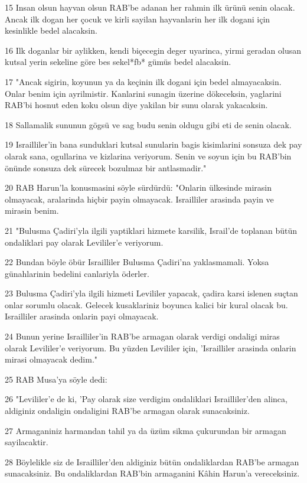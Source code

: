\par 15 Insan olsun hayvan olsun RAB'be adanan her rahmin ilk ürünü senin olacak. Ancak ilk dogan her çocuk ve kirli sayilan hayvanlarin her ilk dogani için kesinlikle bedel alacaksin.
\par 16 Ilk doganlar bir aylikken, kendi biçecegin deger uyarinca, yirmi geradan olusan kutsal yerin sekeline göre bes sekel*fb* gümüs bedel alacaksin.
\par 17 "Ancak sigirin, koyunun ya da keçinin ilk dogani için bedel almayacaksin. Onlar benim için ayrilmistir. Kanlarini sunagin üzerine dökeceksin, yaglarini RAB'bi hosnut eden koku olsun diye yakilan bir sunu olarak yakacaksin.
\par 18 Sallamalik sununun gögsü ve sag budu senin oldugu gibi eti de senin olacak.
\par 19 Israilliler'in bana sunduklari kutsal sunularin bagis kisimlarini sonsuza dek pay olarak sana, ogullarina ve kizlarina veriyorum. Senin ve soyun için bu RAB'bin önünde sonsuza dek sürecek bozulmaz bir antlasmadir."
\par 20 RAB Harun'la konusmasini söyle sürdürdü: "Onlarin ülkesinde mirasin olmayacak, aralarinda hiçbir payin olmayacak. Israilliler arasinda payin ve mirasin benim.
\par 21 "Bulusma Çadiri'yla ilgili yaptiklari hizmete karsilik, Israil'de toplanan bütün ondaliklari pay olarak Levililer'e veriyorum.
\par 22 Bundan böyle öbür Israilliler Bulusma Çadiri'na yaklasmamali. Yoksa günahlarinin bedelini canlariyla öderler.
\par 23 Bulusma Çadiri'yla ilgili hizmeti Levililer yapacak, çadira karsi islenen suçtan onlar sorumlu olacak. Gelecek kusaklariniz boyunca kalici bir kural olacak bu. Israilliler arasinda onlarin payi olmayacak.
\par 24 Bunun yerine Israilliler'in RAB'be armagan olarak verdigi ondaligi miras olarak Levililer'e veriyorum. Bu yüzden Levililer için, 'Israilliler arasinda onlarin mirasi olmayacak dedim."
\par 25 RAB Musa'ya söyle dedi:
\par 26 "Levililer'e de ki, 'Pay olarak size verdigim ondaliklari Israilliler'den alinca, aldiginiz ondaligin ondaligini RAB'be armagan olarak sunacaksiniz.
\par 27 Armaganiniz harmandan tahil ya da üzüm sikma çukurundan bir armagan sayilacaktir.
\par 28 Böylelikle siz de Israilliler'den aldiginiz bütün ondaliklardan RAB'be armagan sunacaksiniz. Bu ondaliklardan RAB'bin armaganini Kâhin Harun'a vereceksiniz.
